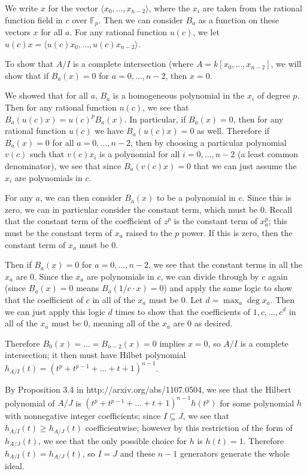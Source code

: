 \documentclass{article}
\numberwithin{equation}{section}
\begin{document}
We write $x$ for the vector $\langle x_0,\dots, x_{n-2} \rangle$, where the $x_i$ are taken from the rational function field in $c$ over $\mathbb{F}_p$. Then we can consider $B_a$ as a function on these vectors $x$ for all $a$. For any rational function $u( c)$, we let $u(c )x=\langle u(c )x_0,\dots, u(c )x_{n-2}\rangle$. 

To show that $A/I$ is a complete intersection (where $A=k[x_0,\dots,x_{n-2}]$, we will show that if $B_a(x)=0$ for $a=0,\dots,n-2$, then $x=0$. 

We showed that for all $a$, $B_a$ is a homogeneous polynomial in the $x_i$ of degree $p$. Then for any rational function $u(c )$, we see that $B_a(u(c )x)=u(c )^pB_a(x)$. In particular, if $B_a(x)=0$, then for any rational function $u(c )$ we have $B_a(u(c )x)=0$ as well. Therefore if $B_a(x) = 0$ for all $a=0,\dots,n-2$, then by choosing a particular polynomial $v(c )$ such that $v(c )x_i$ is a polynomial for all $i=0,\dots,n-2$ (a least common denominator), we see that since $B_a(v(c )x)=0$ that we can just assume the $x_i$ are polynomials in $c$. 

For any $a$, we can then consider $B_a(x)$ to be a polynomial in $c$. Since this is zero, we can in particular consider the constant term, which must be $0$. Recall that the constant term of the coefficient of $z^p$ is the constant term of $x_a^p$; this must be the constant term of $x_a$ raised to the $p$ power. If this is zero, then the constant term of $x_a$ must be $0$. 

Then if $B_a(x) =0$ for $a=0,\dots,n-2$, we see that the constant terms in all the $x_a$ are $0$. Since the $x_a$ are polynomials in $c$, we can divide through by $c$ again (since $B_a(x)=0$ means $B_a(1/c\cdot x)=0$) and apply the same logic to show that the coefficient of $c$ in all of the $x_a$ must be $0$. Let $d=\max_a \deg x_a$. Then we can just apply this logic $d$ times to show that the coefficients of $1,c,\dots,c^d$ in all of the $x_a$ must be $0$, meaning all of the $x_a$ are $0$ as desired. 

Therefore $B_0(x) = \dots = B_{n-2}(x)=0$ implies $x=0$, so $A/I$ is a complete intersection; it then must have Hilbet polynomial $h_{A/I}(t)=(t^p+t^{p-1}+\dots+t+1)^{n-1}$. 

By Proposition 3.4 in http://arxiv.org/abs/1107.0504, we see that the Hilbert polynomial of $A/J$ is $(t^p+t^{p-1}+\dots+t+1)^{n-1}h(t^p)$ for some polynomial $h$ with nonnegative integer coefficients; since $I \subseteq J$, we see that $h_{A/I}(t) \ge h_{A/J}(t)$ coefficientwise; however by this restriction of the form of $h_{A/J}(t)$, we see that the only possible choice for $h$ is $h(t)=1$. Therefore $h_{A/I}(t)=h_{A/J}(t)$, so $I=J$ and these $n-1$ generators generate the whole ideal.
\end{document}
